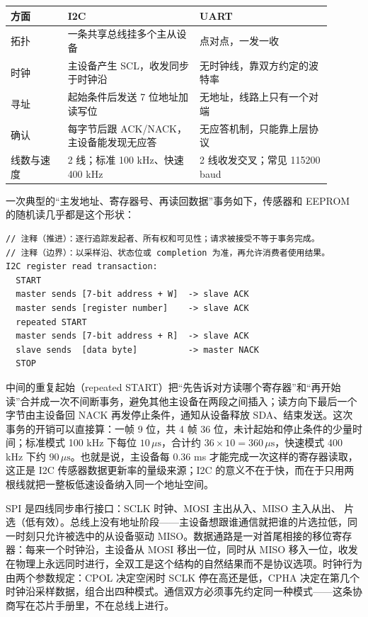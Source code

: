 \begin{longtable}{L{0.16\linewidth}L{0.37\linewidth}L{0.37\linewidth}}
\toprule
方面 & I2C & UART \\
\midrule
拓扑 & 一条共享总线挂多个主从设备 & 点对点，一发一收 \\\tablerowrule
时钟 & 主设备产生 SCL，收发同步于时钟沿 & 无时钟线，靠双方约定的波特率 \\\tablerowrule
寻址 & 起始条件后发送 7 位地址加读写位 & 无地址，线路上只有一个对端 \\\tablerowrule
确认 & 每字节后跟 ACK/NACK，主设备能发现无应答 & 无应答机制，只能靠上层协议 \\\tablerowrule
线数与速度 & 2 线；标准 100 kHz、快速 400 kHz & 2 线收发交叉；常见 115200 baud \\
\bottomrule
\end{longtable}

一次典型的“主发地址、寄存器号、再读回数据”事务如下，传感器和 EEPROM 的随机读几乎都是这个形状：

\begin{lstlisting}
// 注释（推进）：逐行追踪发起者、所有权和可见性；请求被接受不等于事务完成。
// 注释（边界）：以采样沿、状态位或 completion 为准，再允许消费者使用结果。
I2C register read transaction:
  START
  master sends [7-bit address + W]  -> slave ACK
  master sends [register number]    -> slave ACK
  repeated START
  master sends [7-bit address + R]  -> slave ACK
  slave sends  [data byte]          -> master NACK
  STOP
\end{lstlisting}

中间的重复起始（repeated START）把“先告诉对方读哪个寄存器”和“再开始读”合并成一次不间断事务，避免其他主设备在两段之间插入；读方向下最后一个字节由主设备回 NACK 再发停止条件，通知从设备释放 SDA、结束发送。这次事务的开销可以直接算：一帧 9 位，共 4 帧 36 位，未计起始和停止条件的少量时间；标准模式 100 kHz 下每位 $10\,\mu\text{s}$，合计约 $36\times10=360\,\mu\text{s}$，快速模式 400 kHz 下约 $90\,\mu\text{s}$。也就是说，主设备每 0.36 ms 才能完成一次这样的寄存器读取，这正是 I2C 传感器数据更新率的量级来源；I2C 的意义不在于快，而在于只用两根线就把一整板低速设备纳入同一个地址空间。

SPI 是四线同步串行接口：SCLK 时钟、MOSI 主出从入、MISO 主入从出、 片选（低有效）。总线上没有地址阶段——主设备想跟谁通信就把谁的片选拉低，同一时刻只允许被选中的从设备驱动 MISO。数据通路是一对首尾相接的移位寄存器：每来一个时钟沿，主设备从 MOSI 移出一位，同时从 MISO 移入一位，收发在物理上永远同时进行，全双工是这个结构的自然结果而不是协议选项。时钟行为由两个参数规定：CPOL 决定空闲时 SCLK 停在高还是低，CPHA 决定在第几个时钟沿采样数据，组合出四种模式。通信双方必须事先约定同一种模式——这条协商写在芯片手册里，不在总线上进行。

